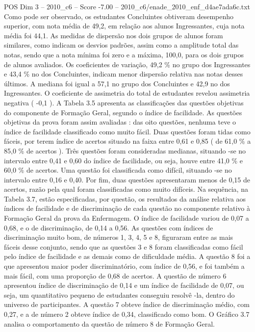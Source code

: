 \begin{textsample}{POS Dim 3 – 2010\_c6 – Score -7.00 – 2010\_c6/enade\_2010\_enf\_d4ae7ada6c.txt}
Como pode ser observado, os estudantes Concluintes obtiveram desempenho superior, com nota média de 49,2, em relação aos alunos Ingressantes, cuja nota média foi 44,1.
As medidas de dispersão nos dois grupos de alunos foram similares, como indicam os desvios padrões, assim como a amplitude total das notas, sendo que a nota mínima foi zero e a máxima, 100,0, para os dois grupos de alunos avaliados.
Os coeficientes de variação, 49,2 \% no grupo dos Ingressantes e 43,4 \% no dos Concluintes, indicam menor dispersão relativa nas notas desses últimos.
A mediana foi igual a 57,1 no grupo dos Concluintes e 42,9 no dos Ingressantes.
O coeficiente de assimetria do total de estudantes revelou assimetria negativa ( -0,1 ).
A Tabela 3.5 apresenta as classificações das questões objetivas do componente de Formação Geral, segundo o índice de facilidade.
As questões objetivas da prova foram assim avaliadas : das oito questões, nenhuma teve o índice de facilidade classificado como muito fácil.
Duas questões foram tidas como fáceis, por terem índice de acertos situado na faixa entre 0,61 e 0,85 ( de 61,0 \% a 85,0 \% de acertos ).
Três questões foram consideradas medianas, situando -se no intervalo entre 0,41 e 0,60 do índice de facilidade, ou seja, houve entre 41,0 \% e 60,0 \% de acertos.
Uma questão foi classificada como difícil, situando -se no intervalo entre 0,16 e 0,40.
Por fim, duas questões apresentaram menos de 0,15 de acertos, razão pela qual foram classificadas como muito difíceis.
Na sequência, na Tabela 3.7, estão especificadas, por questão, os resultados da análise relativa aos índices de facilidade e de discriminação de cada questão no componente relativo à Formação Geral da prova da Enfermagem.
O índice de facilidade variou de 0,07 a 0,68, e o de discriminação, de 0,14 a 0,56.
As questões com índices de discriminação muito bom, de números 1, 3, 4, 5 e 8, figuraram entre as mais fáceis desse conjunto, sendo que as questões 3 e 8 foram classificadas como fácil pelo índice de facilidade e as demais como de dificuldade média.
A questão 8 foi a que apresentou maior poder discriminatório, com índice de 0,56, e foi também a mais fácil, com uma proporção de 0,68 de acertos.
A questão de número 6 apresentou índice de discriminação de 0,14 e um índice de facilidade de 0,07, ou seja, um quantitativo pequeno de estudantes conseguiu resolvê -la, dentro do universo de participantes.
A questão 7 obteve índice de discriminação médio, com 0,27, e a de número 2 obteve índice de 0,34, classificado como bom.
O Gráfico 3.7 analisa o comportamento da questão de número 8 de Formação Geral.

\end{textsample}
